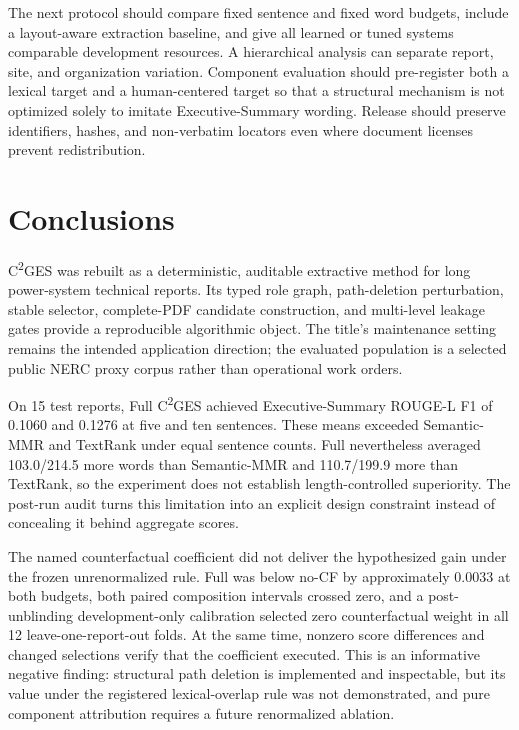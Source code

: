 \documentclass[applsci,article,submit,moreauthors]{Definitions/mdpi}
\newcommand{\cges}{C\textsuperscript{2}GES}
\begin{document}
The next protocol should compare fixed sentence and fixed word budgets, include a layout-aware extraction baseline, and give all learned or tuned systems comparable development resources. A hierarchical analysis can separate report, site, and organization variation. Component evaluation should pre-register both a lexical target and a human-centered target so that a structural mechanism is not optimized solely to imitate Executive-Summary wording. Release should preserve identifiers, hashes, and non-verbatim locators even where document licenses prevent redistribution.

\section{Conclusions}

\cges{} was rebuilt as a deterministic, auditable extractive method for long power-system technical reports. Its typed role graph, path-deletion perturbation, stable selector, complete-PDF candidate construction, and multi-level leakage gates provide a reproducible algorithmic object. The title's maintenance setting remains the intended application direction; the evaluated population is a selected public NERC proxy corpus rather than operational work orders.

On 15 test reports, Full \cges{} achieved Executive-Summary ROUGE-L F1 of 0.1060 and 0.1276 at five and ten sentences. These means exceeded Semantic-MMR and TextRank under equal sentence counts. Full nevertheless averaged 103.0/214.5 more words than Semantic-MMR and 110.7/199.9 more than TextRank, so the experiment does not establish length-controlled superiority. The post-run audit turns this limitation into an explicit design constraint instead of concealing it behind aggregate scores.

The named counterfactual coefficient did not deliver the hypothesized gain under the frozen unrenormalized rule. Full was below no-CF by approximately 0.0033 at both budgets, both paired composition intervals crossed zero, and a post-unblinding development-only calibration selected zero counterfactual weight in all 12 leave-one-report-out folds. At the same time, nonzero score differences and changed selections verify that the coefficient executed. This is an informative negative finding: structural path deletion is implemented and inspectable, but its value under the registered lexical-overlap rule was not demonstrated, and pure component attribution requires a future renormalized ablation.
\end{document}
